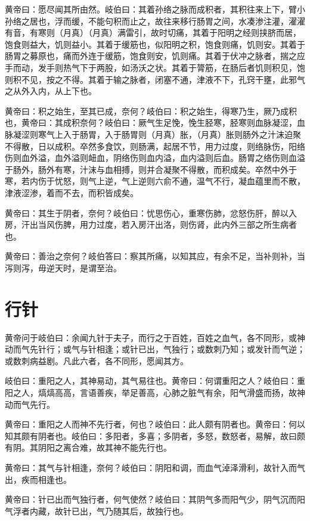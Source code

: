 \documentclass[a4paper,12pt,UTF8,twoside]{ctexbook}
\begin{document}
	黄帝曰：愿尽闻其所由然。岐伯曰：其着孙络之脉而成积者，其积往来上下，臂小孙络之居也，浮而缓，不能句积而止之，故往来移行肠胃之间，水凑渗注灌，濯濯有音，有寒则（月真）（月真）满雷引，故时切痛，其着于阳明之经则挟脐而居，饱食则益大，饥则益小。其着于缓筋也，似阳明之积，饱食则痛，饥则安。其着于肠胃之募原也，痛而外连于缓筋，饱食则安，饥则痛。其着于伏冲之脉者，揣之应手而动，发手则热气下于两股，如汤沃之状。其着于膂筋，在肠后者饥则积见，饱则积不见，按之不得。其着于输之脉者，闭塞不通，津液不下，孔窍干壅，此邪气之从外入内，从上下也。
	
	黄帝曰：积之始生，至其已成，奈何？岐伯曰：积之始生，得寒乃生，厥乃成积也，黄帝曰：其成积奈何？岐伯曰：厥气生足悗，悗生胫寒，胫寒则血脉凝涩，血脉凝涩则寒气上入于肠胃，入于肠胃则（月真）胀，（月真）胀则肠外之汁沫迫聚不得散，日以成积。卒然多食饮，则肠满，起居不节，用力过度，则络脉伤，阳络伤则血外溢，血外溢则衄血，阴络伤则血内溢，血内溢则后血。肠胃之络伤则血溢于肠外，肠外有寒，汁沫与血相搏，则并合凝聚不得散，而积成矣。卒然中外于寒，若内伤于忧怒，则气上逆，气上逆则六俞不通，温气不行，凝血蕴里而不散，津液涩渗，着而不去，而积皆成矣。
	
	黄帝曰：其生于阴者，奈何？岐伯曰：忧思伤心，重寒伤肺，忿怒伤肝，醉以入房，汗出当风伤脾，用力过度，若入房汗出洛，则伤肾，此内外三部之所生病者也。
	
	黄帝曰：善治之奈何？岐伯答曰：察其所痛，以知其应，有余不足，当补则补，当泻则泻，毋逆天时，是谓至治。
	
	\chapter{行针}
	
	黄帝问于岐伯曰：余闻九针于夫子，而行之于百姓，百姓之血气，各不同形，或神动而气先针行；或气与针相逢；或针已出，气独行；或数刺乃知；或发针而气逆；或数刺病益剧。凡此六者，各不同形，愿闻其方。
	
	岐伯曰：重阳之人，其神易动，其气易往也。黄帝曰：何谓重阳之人？岐伯曰：重阳之人，熇熇高高，言语善疾，举足善高，心肺之脏气有余，阳气滑盛而扬，故神动而气先行。
	
	黄帝曰：重阳之人而神不先行者，何也？岐伯曰：此人颇有阴者也。黄帝曰：何以知其颇有阴者也。岐伯曰：多阳者，多喜；多阴者，多怒，数怒者，易解，故曰颇有阴。其阴阳之离合难，故其神不能先行也。
	
	黄帝曰：其气与针相逢，奈何？岐伯曰：阴阳和调，而血气淖泽滑利，故针入而气出，疾而相逢也。
	
	黄帝曰：针已出而气独行者，何气使然？岐伯曰：其阴气多而阳气少，阴气沉而阳气浮者内藏，故针已出，气乃随其后，故独行也。
	
\end{document}
